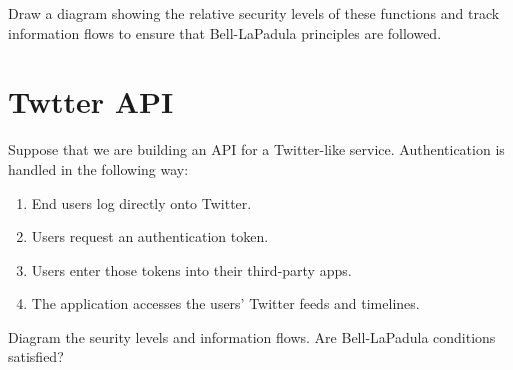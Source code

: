 \documentclass{article}
\begin{document}
Draw a diagram showing the relative security levels of these functions and track information flows to ensure that Bell-LaPadula principles are followed.

\newpage

\section{Twtter API}
Suppose that we are building an API for a Twitter-like service. Authentication is handled in the following way: 

\begin{enumerate}
	\item End users log directly onto Twitter.
	\item Users request an authentication token.
	\item Users enter those tokens into their third-party apps.
	\item The application accesses the users' Twitter feeds and
	timelines.
\end{enumerate}

Diagram the seurity levels and information flows.  Are Bell-LaPadula conditions satisfied?
\end{document}
